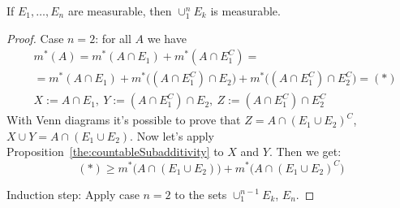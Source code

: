 \begin{proposition}  
    If $E_1, \dots, E_n$ are measurable, then 
    $\cup_{1}^n E_k$ is measurable.
\end{proposition}
\begin{proof}
    Case $n=2$:
    for all $A$ we have
    \begin{align*}
        &
        m^*(A) = m^*(A \cap E_1) +  m^*(A \cap E_1^C)
        =\\&=
        m^*(A \cap E_1) + m^*\bigl((A \cap E_1^C) \cap E_2\bigr) +
        m^*\bigl((A \cap E_1^C) \cap E_2^C\bigr) = (*)
        \\&
        X := A \cap E_1,\
        Y := (A \cap E_1^C) \cap E_2,\
        Z := (A \cap E_1^C) \cap E_2^C
    \end{align*}
    With Venn diagrams it's possible to prove that 
    $Z = A \cap (E_1 \cup E_2)^C$, $X \cup Y = A \cap (E_1 \cup E_2)$.
    Now let's apply Proposition~\ref{the:countableSubadditivity} to $X$ and $Y$. Then we get:
    \[
        (*) \ge m^*\bigl(A \cap (E_1 \cup E_2)\bigr) +
        m^*\bigl(A \cap (E_1 \cup E_2)^C\bigr)
    \]

    Induction step:
    Apply case $n=2$ to the sets 
    $\cup_{1}^{n - 1} E_k$, $E_n$.
\end{proof}